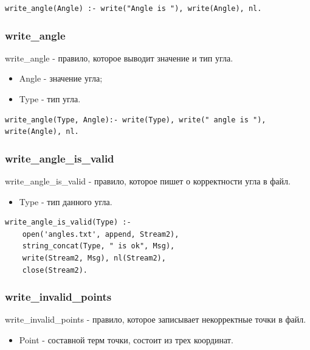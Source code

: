 \begin{lstlisting}[caption=Реализация правила write\_angle, label=rules:writeangle]
write_angle(Angle) :- write("Angle is "), write(Angle), nl.
\end{lstlisting}

\subsubsection{write\_angle}
\hspace{0.6cm} write\_angle - правило, которое выводит значение и тип угла.

\begin{itemize}
	\item Angle - значение угла;
	\item Type - тип угла.
\end{itemize}

\begin{lstlisting}[caption=Реализация правила write\_angle, label=rules:writeangle]
write_angle(Type, Angle):- write(Type), write(" angle is "), write(Angle), nl.
\end{lstlisting}

\subsubsection{write\_angle\_is\_valid}
\hspace{0.6cm} write\_angle\_is\_valid - правило, которое пишет о корректности угла в файл.

\begin{itemize}
	\item Type - тип данного угла.
\end{itemize}

\begin{lstlisting}[caption=Реализация правила write\_angle\_is\_valid, label=rules:writeangleisvalid]
write_angle_is_valid(Type) :- 
	open('angles.txt', append, Stream2),
	string_concat(Type, " is ok", Msg),
	write(Stream2, Msg), nl(Stream2),
	close(Stream2).
\end{lstlisting}

\subsubsection{write\_invalid\_points}
\hspace{0.6cm} write\_invalid\_points - правило, которое записывает некорректные точки в файл.

\begin{itemize}
	\item Point - составной терм точки, состоит из трех координат.
\end{itemize}

